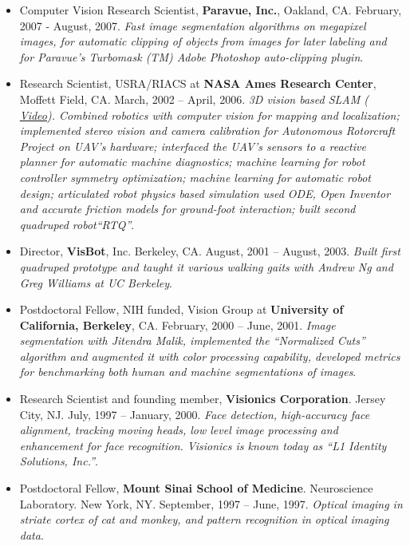 \documentclass[conference,lettersize,twocolumn,twosize]{./IEEEtran}
\begin{document}
\begin{center}
\begin{itemize}
  \item{Computer Vision Research Scientist, {\bf Paravue, Inc.},
    Oakland, CA.  February, 2007 - August, 2007.  \emph{Fast image
      segmentation algorithms on megapixel images, for automatic
      clipping of objects from images for later labeling and for
      Paravue's Turbomask (TM) Adobe Photoshop auto-clipping plugin}.}
  \item{Research Scientist, USRA/RIACS at {\bf NASA Ames Research
      Center}, Moffett Field, CA.  March, 2002 -- April, 2006.
    \emph{3D vision based SLAM (
      \href{https://www.youtube.com/watch?v=zmq\_9Zw\_Awo)}{Video}). Combined
      robotics with computer vision for mapping and localization;
      implemented stereo vision and camera calibration for Autonomous
      Rotorcraft Project on UAV's hardware; interfaced the UAV's
      sensors to a reactive planner for automatic machine diagnostics;
      machine learning for robot controller symmetry optimization;
      machine learning for automatic robot design; articulated robot
      physics based simulation used ODE, Open Inventor and accurate
      friction models for ground-foot interaction; built second
      quadruped robot``RTQ''}.}
  \item{Director, {\bf VisBot}, Inc. Berkeley, CA.  August, 2001 --
    August, 2003.  \emph{Built first quadruped prototype and taught it
      various walking gaits with Andrew Ng and Greg Williams at UC
      Berkeley}.}
  \item{Postdoctoral Fellow, NIH funded, Vision Group at {\bf
      University of California, Berkeley}, CA. February, 2000 -- June,
    2001.  \emph{Image segmentation with Jitendra Malik, implemented
      the ``Normalized Cuts'' algorithm and augmented it with color
      processing capability, developed metrics for benchmarking both
      human and machine segmentations of images}.}
  \item{Research Scientist and founding member, {\bf Visionics
      Corporation}. Jersey City, NJ. July, 1997 -- January,
    2000. \emph{Face detection, high-accuracy face alignment,
      tracking moving heads, low level image processing and
      enhancement for face recognition.  Visionics is known today as
      ``L1 Identity Solutions, Inc.''}.}
  \item{Postdoctoral Fellow, {\bf Mount Sinai School of
      Medicine}. Neuroscience Laboratory. New York, NY. September,
    1997 -- June, 1997. \emph{Optical imaging in striate cortex of cat
      and monkey, and pattern recognition in optical imaging data}. }

\end{itemize}
\end{center}
\end{document}
